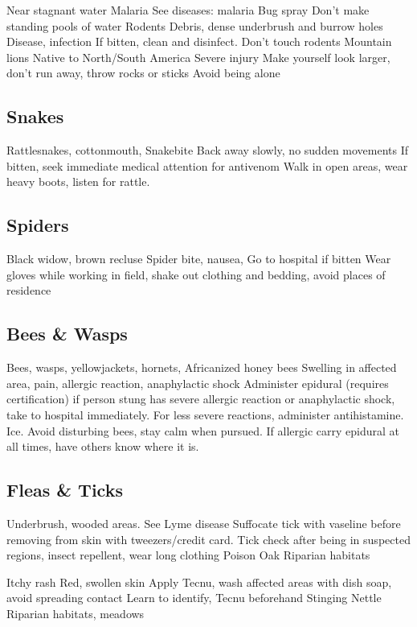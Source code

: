 \documentclass[12pt]{../SOP2}
\begin{document}
Near stagnant water
Malaria
See diseases: malaria
Bug spray
Don’t make standing pools of water
Rodents
Debris, dense underbrush and burrow holes
Disease, infection
If bitten, clean and disinfect.
Don’t touch rodents
Mountain lions
Native to North/South America
Severe injury
Make yourself look larger, don’t run away, throw rocks or sticks
Avoid being alone 


\subsection{Snakes}

Rattlesnakes, cottonmouth, 
Snakebite
Back away slowly, no sudden movements
If bitten, seek immediate medical attention for antivenom
Walk in open areas, wear heavy boots, listen for rattle.

\subsection{Spiders}

Black widow, brown recluse
Spider bite, nausea, 
Go to hospital if bitten
Wear gloves while working in field, shake out clothing and bedding, avoid places of residence

\subsection{Bees \& Wasps}

Bees, wasps, yellowjackets, hornets, Africanized honey bees
Swelling in affected area, pain, allergic reaction, anaphylactic shock
Administer epidural (requires certification) if person stung has severe allergic reaction or anaphylactic shock, take to hospital immediately. For less severe reactions, administer antihistamine. Ice.
Avoid disturbing bees, stay calm when pursued. If allergic carry epidural at all times, have others know where it is.

\subsection{Fleas \& Ticks}

Underbrush, wooded areas.
See Lyme disease
Suffocate tick with vaseline before removing from skin with tweezers/credit card.
Tick check after being in suspected regions, insect repellent, wear long clothing
Poison Oak
Riparian habitats

Itchy rash
Red, swollen skin
Apply Tecnu, wash affected areas with dish soap, avoid spreading contact
Learn to identify, Tecnu beforehand
Stinging Nettle
Riparian habitats, meadows
\end{document}
